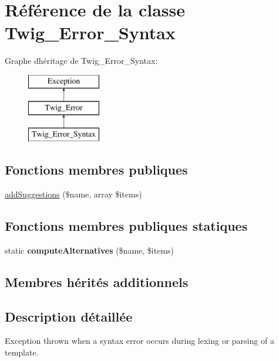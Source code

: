\hypertarget{class_twig___error___syntax}{}\section{Référence de la classe Twig\+\_\+\+Error\+\_\+\+Syntax}
\label{class_twig___error___syntax}
Graphe d\textquotesingle{}héritage de Twig\+\_\+\+Error\+\_\+\+Syntax\+:\begin{figure}[H]
\begin{center}
\leavevmode
\includegraphics[height=3.000000cm]{class_twig___error___syntax}
\end{center}
\end{figure}
\subsection*{Fonctions membres publiques}
\begin{DoxyCompactItemize}
\item 
\hyperlink{class_twig___error___syntax_a0a60dace857be1e02336bf7e371d0e38}{add\+Suggestions} (\$name, array \$items)
\end{DoxyCompactItemize}
\subsection*{Fonctions membres publiques statiques}
\begin{DoxyCompactItemize}
\item 
static {\bfseries compute\+Alternatives} (\$name, \$items)\hypertarget{class_twig___error___syntax_a2dda549e45b2d8e955b14c874d2a328f}{}\label{class_twig___error___syntax_a2dda549e45b2d8e955b14c874d2a328f}

\end{DoxyCompactItemize}
\subsection*{Membres hérités additionnels}


\subsection{Description détaillée}
Exception thrown when a syntax error occurs during lexing or parsing of a template.

